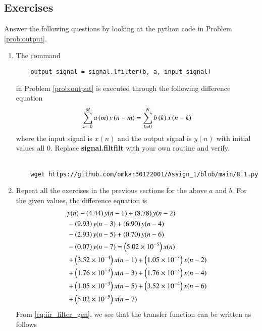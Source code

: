 \documentclass[journal,12pt,twocolumn]{IEEEtran}
\renewcommand\thesection{\arabic{section}}
\begin{document}
\begin{enumerate}[label=\thesection.\arabic*]
\section{Exercises}
Answer the following questions by looking at the python code in Problem \ref{prob:output}.
\begin{enumerate}[label=\thesection.\arabic*]
	\item
	The command
	\begin{lstlisting}
	output_signal = signal.lfilter(b, a, input_signal)
	\end{lstlisting}
	in Problem \ref{prob:output} is executed through the following difference equation
	\begin{equation}
		\label{eq:iir_filter_gen}
		\sum _{m=0}^{M}a\left(m\right)y\left(n-m\right)=\sum _{k=0}^{N}b\left(k\right)x\left(n-k\right)
	\end{equation}
	where the input signal is $x(n)$ and the output signal is $y(n)$ with initial values all 0. Replace
	\textbf{signal.filtfilt} with your own routine and verify.\\
	\solution \\
	\begin{lstlisting}
	wget https://github.com/omkar30122001/Assign_1/blob/main/8.1.py
	\end{lstlisting}
	\item Repeat all the exercises in the previous sections for the above $a$ and $b$.
	\solution For the given values, the difference equation is
	\begin{align}
		&y(n) - \left(4.44\right)y(n - 1) + \left(8.78\right)y(n - 2) \nonumber \\
		&- \left(9.93\right)y(n - 3) + \left(6.90\right)y(n - 4) \nonumber \\
		&- \left(2.93\right)y(n - 5) \nonumber + \left(0.70\right)y(n - 6) \nonumber \\
		&- \left(0.07\right)y(n - 7) = \left(5.02 \times 10^{-5}\right)x(n) \nonumber \\
		&+ \left(3.52 \times 10^{-4}\right)x(n - 1) + \left(1.05 \times 10^{-3}\right)x(n - 2) \nonumber \\
		&+ \left(1.76 \times 10^{-3}\right)x(n - 3) + \left(1.76 \times 10^{-3}\right)x(n - 4) \nonumber \\
		&+ \left(1.05 \times 10^{-3}\right)x(n - 5) + \left(3.52 \times 10^{-4}\right)x(n - 6) \nonumber \\
		&+ \left(5.02 \times 10^{-5}\right)x(n - 7)
	\end{align}
	From \eqref{eq:iir_filter_gen}, we see that the transfer function can be written as follows
	\begin{align}

\end{align}
\end{enumerate}
\end{enumerate}
\end{document}
